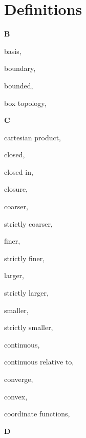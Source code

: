 \section*{Definitions}

\begin{multicols}{2}

\vspace{1em}\noindent\large{\textbf{B}}

basis, \pageref{def:Basis}

boundary, \pageref{def:Boundary}

bounded, \pageref{def:Bounded}

box topology, \pageref{def:BoxTopology}

\vspace{1em}\noindent\large{\textbf{C}}

cartesian product, \pageref{def:CartesianProduct}

closed, \pageref{def:Closed}

\hspace{1em}closed in, \pageref{def:ClosedIn}

closure, \pageref{def:Closure}

coarser, \pageref{def:Comparable}

\hspace{1em}strictly coarser, \pageref{def:Comparable}

finer, \pageref{def:Comparable}

\hspace{1em}strictly finer, \pageref{def:Comparable}

larger, \pageref{def:Comparable}

\hspace{1em}strictly larger, \pageref{def:Comparable}

smaller, \pageref{def:Comparable}

\hspace{1em}strictly smaller, \pageref{def:Comparable}

continuous, \pageref{def:Continuous}

\hspace{1em}continuous relative to, \pageref{def:ContinuousRelativeTo}

converge, \pageref{def:Converge}

convex, \pageref{def:Convex}

coordinate functions, \pageref{def:CoordinateFunctions}

\vspace{1em}\noindent\large{\textbf{D}}


\end{multicols}
